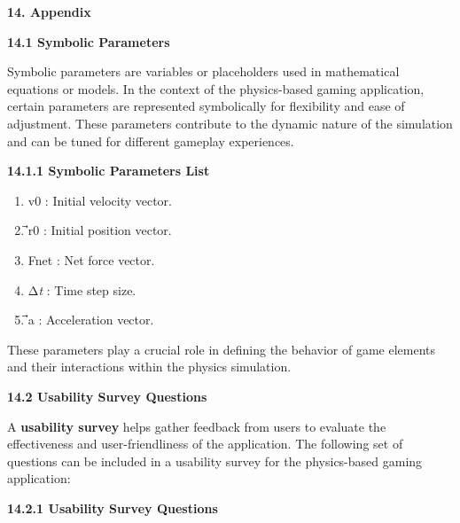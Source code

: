 \documentclass[
]{article}
\begin{document}
\protect\hypertarget{Al}{}{}\textbf{14. Appendix}

\protect\hypertarget{All}{}{}\textbf{14.1 Symbolic Parameters}

Symbolic parameters are variables or placeholders used in mathematical
equations or models. In the context of the physics-based gaming
application, certain parameters are represented symbolically for
flexibility and ease of adjustment. These parameters contribute to the
dynamic nature of the simulation and can be tuned for different gameplay
experiences.

\textbf{14.1.1 Symbolic Parameters List}

\begin{enumerate}
\def\labelenumi{\arabic{enumi}.}
\item
  v0\hspace{0pt} : Initial velocity vector.
\item
  ⃗r0 : Initial position vector.
\item
  Fnet\hspace{0pt} : Net force vector.
\item
  Δ\emph{t} : Time step size.
\item
  ⃗a : Acceleration vector.
\end{enumerate}

These parameters play a crucial role in defining the behavior of game
elements and their interactions within the physics simulation.

\protect\hypertarget{Allll}{}{}\textbf{14.2 Usability Survey Questions}

A \textbf{usability survey} helps gather feedback from users to evaluate
the effectiveness and user-friendliness of the application. The
following set of questions can be included in a usability survey for the
physics-based gaming application:

\textbf{14.2.1 Usability Survey Questions}
\end{document}
